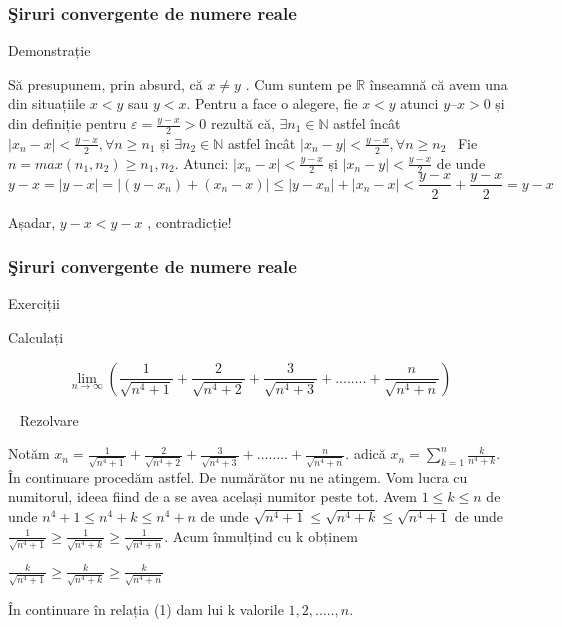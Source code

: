 \documentclass{beamer}
\theoremstyle{plain}
\begin{document}
\frame
{
\frametitle{\c Siruri convergente de numere reale}
Demonstrație

Să presupunem, prin absurd, că \(x \neq  y\) . Cum suntem pe \(\mathbb{R}\) înseamnă că avem una din situațiile \(x < y\) sau \(y < x\). Pentru a face o alegere, fie \(x < y\) atunci \(y – x > 0\) și din definiție pentru \(\varepsilon = \frac{y- x}{2}  > 0\) rezultă că, 
\(\exists  n_{1} \in \mathbb{N}\) astfel încât \(\left | x_{n} - x  \right | < \frac{y - x }{2} , \forall n \geq n_{1} \)
și 
\(\exists  n_{2} \in \mathbb{N}\) astfel încât \(\left | x_{n} - y  \right | < \frac{y - x }{2} , \forall n \geq n_{2}\) 
Fie \(n = max (n _{1}, n_{2}) \geq n_{1}, n_{2}.\) Atunci: 
\(\left | x_{n} - x \right | < \frac{y-x}{2}\) și \(\left | x_{n} - y  \right | <  \frac{y-x}{2}\)
de unde 
\begin{displaymath}
  y-x = \left | y-x \right | = \left | (y-x_{n})+ (x_{n} -x) \right |\leq \left | y-x_{n} \right | + \left | x_{n} - x \right | < \frac{y-x}{2} + \frac{y-x}{2} = y-x
\end{displaymath}

	Așadar, \(y-x < y-x\) , contradicție!
}
\frame
{
\frametitle{\c Siruri convergente de numere reale}
Exerciții

Calculați 

\begin{displaymath}
  \lim_{n\to\infty }\left ( \frac{1}{\sqrt{n^{4}+1}}+ \frac{2}{\sqrt{n^{4}+2} } +\frac{3}{\sqrt{n^{4}+3}}+........+\frac{n}{\sqrt{n^{4}+n}}  \right )
\end{displaymath}

 
Rezolvare

Notăm \(x_{n}= \frac{1}{\sqrt{n^{4}+1}} + \frac{2}{\sqrt{n^{4}+2}}+\frac{3}{\sqrt{n^{4}+3}}+........+\frac{n}{\sqrt{n^{4}+n}}\).
adică \(x_{n}= \sum_{k=1}^{n}\frac{k}{n^{4}+k}\).
 
În continuare procedăm astfel. De numărător nu ne atingem. Vom lucra cu numitorul, ideea fiind de a se avea același numitor peste tot. 
Avem \(1\leq k\leq n\) de unde \(n^{4}+1 \leq n^{4}+k \leq n^{4}+n\) de unde \(\sqrt{n^{4}+1}\leq \sqrt{n^{4}+k}\leq \sqrt{n^{4}+1}\) de unde \(\frac{1}{\sqrt{n^{4}+1}}\geq \frac{1}{\sqrt{n^{4}+k}}\geq \frac{1}{\sqrt{n^{4}+n}}\).
Acum înmulțind cu k obținem 


\(\frac{k}{\sqrt{n^{4}+1}}\geq \frac{k}{\sqrt{n^{4}+k}}\geq \frac{k}{\sqrt{n^{4}+n}}\)

În continuare în relația (1) dam lui k valorile \(1,2,.....,n\). 
}
\end{document}

